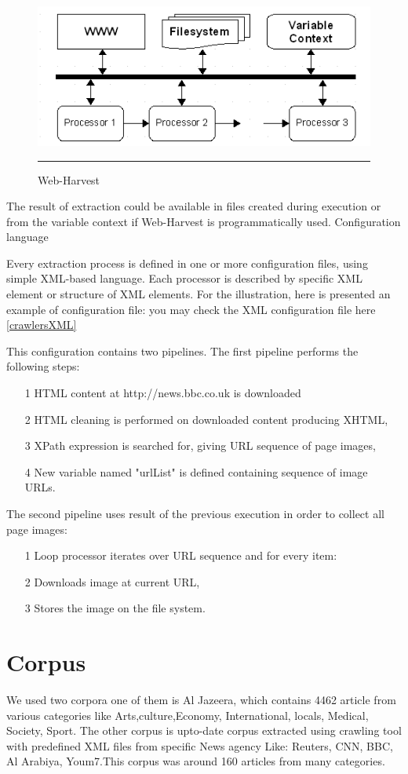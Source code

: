 \begin{figure}[htbp]
	\centering
		\includegraphics{./Figures/diagram1.png}
		\rule{35em}{0.5pt}
	\caption[Web-Harvest]{Web-Harvest}
\end{figure}


The result of extraction could be available in files created during execution or from the variable context if Web-Harvest is programmatically used.
Configuration language

Every extraction process is defined in one or more configuration files, using simple XML-based language. Each processor is described by specific XML element or structure of XML elements. For the illustration, here is presented an example of configuration file:
you may check the XML configuration file here \ref{crawlersXML}

This configuration contains two pipelines. The first pipeline performs the following steps:
\begin{itemize}
\item [1] HTML content at http://news.bbc.co.uk is downloaded
\item [2] HTML cleaning is performed on downloaded content producing XHTML,
\item [3] XPath expression is searched for, giving URL sequence of page images,
\item [4] New variable named "urlList" is defined containing sequence of image URLs.
\end{itemize}
The second pipeline uses result of the previous execution in order to collect all page images:
\begin{itemize}
\item [1] Loop processor iterates over URL sequence and for every item:
\item [2] Downloads image at current URL,
\item [3] Stores the image on the file system.
\end{itemize}


\section{Corpus}
We used two corpora one of them is Al Jazeera, which contains 4462 article from various categories like Arts,culture,Economy, International, locals, Medical, Society, Sport.
The other corpus is upto-date corpus extracted using crawling tool with predefined XML files from specific News agency Like: Reuters, CNN, BBC, Al Arabiya, Youm7.This corpus was around 160 articles from many categories.


